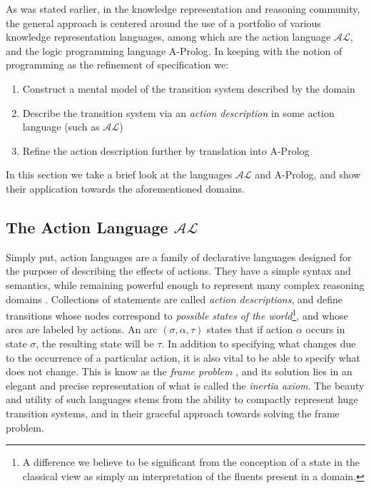 \documentclass{article}
\newcommand{\triple}[3]{\ensuremath{(#1, #2, #3)}}
\newcommand{\AL}{\ensuremath{\mathcal{AL}}}
\begin{document}
As was stated earlier, in the knowledge representation and reasoning community, the general approach is centered around the use of a portfolio of various knowledge representation languages, among which are the action language $\AL$, and the logic programming language A-Prolog. In keeping with the notion of programming as the refinement of specification we:
\begin{enumerate}
    \item Construct a mental model of the transition system described by the domain
    \item Describe the transition system via an \emph{action description} in some action language (such as $\AL$)
    \item Refine the action description further by translation into A-Prolog
\end{enumerate}
In this section we take a brief look at the languages $\AL$ and A-Prolog, and show their application towards the aforementioned domains.

\subsection{The Action Language $\AL$}

Simply put, action languages are a family of declarative languages designed for the purpose of describing the effects of actions. They have a simple syntax and semantics, while remaining powerful enough to represent many complex reasoning domains \cite{Bald2005}. Collections of statements are called \emph{action descriptions}, and define transitions whose nodes correspond to \emph{possible states of the world}\footnote{A difference we believe to be significant from the conception of a state in the classical view as simply an interpretation of the fluents present in a domain.}, and whose arcs are labeled by actions. An arc $\triple{\sigma}{\alpha}{\tau}$ states that if action $\alpha$ occurs in state $\sigma$, the resulting state will be $\tau$. In addition to specifying what changes due to the occurrence of a particular action, it is also vital to be able to specify what does not change. This is know as the \emph{frame problem} \cite{Shan97}, and its solution lies in an elegant and precise representation of what is called the \emph{inertia axiom}. The beauty and utility of such languages stems from the ability to compactly represent huge transition systems, and in their graceful approach towards solving the frame problem.
\end{document}

